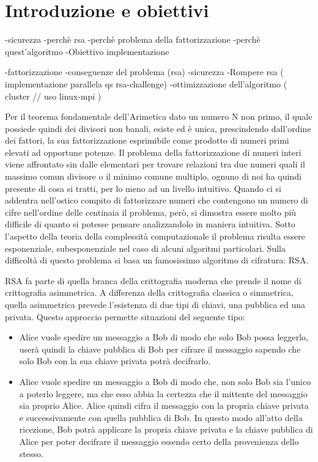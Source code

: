 \section{Introduzione e obiettivi}
\label{sec:introduzione}

-sicurezza
-perchè rsa
-perchè problema della fattorizzazione
-perchè quest'algoritmo
-Obiettivo implementazione


-fattorizzazione
-conseguenze del problema (rsa)
-sicurezza
-Rompere rsa ( implementazione parallela qs rsa-challenge)
-ottimizzazione dell'algoritmo
		( cluster // uso linux-mpi )


Per il teorema fondamentale dell'Arimetica dato un numero N non primo, il quale possiede quindi dei divisori non banali, esiste ed è unica, prescindendo dall'ordine dei fattori, la sua fattorizzazione esprimibile come prodotto di numeri primi elevati ad opportune potenze.
Il problema della fattorizzazione di numeri interi viene affrontato sin dalle elementari per trovare relazioni tra due numeri quali il massimo comun divisore o il minimo comune multiplo, ognuno di noi ha quindi presente di cosa si tratti, per lo meno ad un livello intuitivo.
Quando ci si addentra nell'ostico compito di fattorizzare numeri che contengono un numero di cifre nell'ordine delle centinaia il problema, però, si dimostra essere molto più difficile di quanto si potesse pensare analizzandolo in maniera intuitiva.
Sotto l'aspetto della teoria della complessità computazionale il problema risulta essere esponenziale, subesponenziale nel caso di alcuni algoritmi particolari.
Sulla difficoltà di questo problema si basa un famosissimo algoritmo di cifratura: RSA.

RSA fa parte di quella branca della crittografia moderna che prende il nome di crittografia asimmetrica.
A differenza della crittografia classica o simmetrica, quella asimmetrica prevede l'esistenza di due tipi di chiavi, una pubblica ed una privata.
Questo approccio permette situazioni del seguente tipo:
\begin{itemize}


\item Alice vuole spedire un messaggio a Bob di modo che solo Bob possa leggerlo, userà quindi la chiave pubblica di Bob per cifrare il messaggio sapendo che solo Bob con la sua chiave privata potrà decifrarlo.

\item Alice vuole spedire un messaggio a Bob di modo che, non solo Bob sia l'unico a poterlo leggere, ma che esso abbia la certezza che il mittente del messaggio sia proprio Alice.
Alice quindi cifra il messaggio con la propria chiave privata e successivamente con quella pubblica di Bob. In questo modo all'atto della ricezione, Bob potrà applicare la propria chiave privata e la chiave pubblica di Alice per poter decifrare il messaggio essendo certo della provenienza dello stesso.

\end{itemize}

